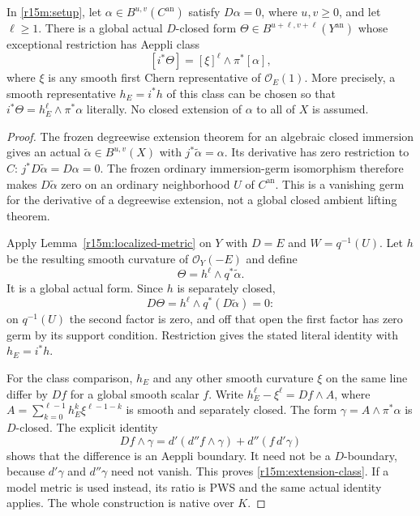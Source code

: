 \begin{proposition}
\label{r15m:localized-extension}
In \eqref{r15m:setup}, let
$\alpha\in B^{u,v}(C^{\mathrm{an}})$ satisfy $D\alpha=0$,
where $u,v\geq0$, and let $\ell\geq1$.
There is a global actual $D$-closed form
$\Theta\in B^{u+\ell,v+\ell}(Y^{\mathrm{an}})$ whose
exceptional restriction has Aeppli class
\[
                  [i^*\Theta]=[\xi]^\ell\wedge\pi^*[\alpha],
\tag{SD15.3}\label{r15m:extension-class}
\]
where $\xi$ is any smooth first Chern representative of
$\mathcal O_E(1)$.  More precisely, a smooth representative
$h_E=i^*h$ of this class can be chosen so that
$i^*\Theta=h_E^\ell\wedge\pi^*\alpha$ literally.
No closed extension of $\alpha$ to all of $X$ is assumed.
\end{proposition}

\begin{proof}
The frozen degreewise extension theorem for an algebraic
closed immersion gives an actual
$\widetilde\alpha\in B^{u,v}(X)$ with
$j^*\widetilde\alpha=\alpha$.
Its derivative has zero restriction to $C$:
$j^*D\widetilde\alpha=D\alpha=0$.
The frozen ordinary immersion-germ isomorphism therefore
makes $D\widetilde\alpha$ zero on an ordinary neighborhood
$U$ of $C^{\mathrm{an}}$.
This is a vanishing germ for the derivative of a degreewise
extension, not a global closed ambient lifting theorem.

Apply Lemma~\ref{r15m:localized-metric} on $Y$ with
$D=E$ and $W=q^{-1}(U)$.  Let $h$ be the resulting smooth
curvature of $\mathcal O_Y(-E)$ and define
\[
                   \Theta=h^\ell\wedge q^*\widetilde\alpha.
\tag{SD15.4}\label{r15m:extension-form}
\]
It is a global actual form.  Since $h$ is separately closed,
\[
          D\Theta=h^\ell\wedge q^*(D\widetilde\alpha)=0:
\]
on $q^{-1}(U)$ the second factor is zero, and off that open
the first factor has zero germ by its support condition.
Restriction gives the stated literal identity with $h_E=i^*h$.

For the class comparison, $h_E$ and any other smooth
curvature $\xi$ on the same line differ by $Df$ for a
global smooth scalar $f$.  Write
$h_E^\ell-\xi^\ell=Df\wedge A$, where
$A=\sum_{k=0}^{\ell-1}h_E^k\xi^{\ell-1-k}$ is smooth
and separately closed.  The form
$\gamma=A\wedge\pi^*\alpha$ is $D$-closed.
The explicit identity
\[
             Df\wedge\gamma
                =d'(d''f\wedge\gamma)+d''(f\,d'\gamma)
\tag{SD15.5}\label{r15m:metric-Aeppli}
\]
shows that the difference is an Aeppli boundary.
It need not be a $D$-boundary, because $d'\gamma$ and
$d''\gamma$ need not vanish.  This proves
\eqref{r15m:extension-class}.  If a model metric is used
instead, its ratio is PWS and the same actual identity
applies.  The whole construction is native over $K$.
\end{proof}

